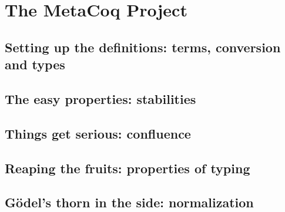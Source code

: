 \chapter{The MetaCoq Project}
\label{chap:metacoq-general}

\margintoc

\section[Terms, conversion and types]{Setting up the definitions: terms, conversion and types}

\section[Stabilities]{The easy properties: stabilities}

\section[Confluence]{Things get serious: confluence}

\section[Properties of typing]{Reaping the fruits: properties of typing}

\section[Normalization]{Gödel’s thorn in the side: normalization}
